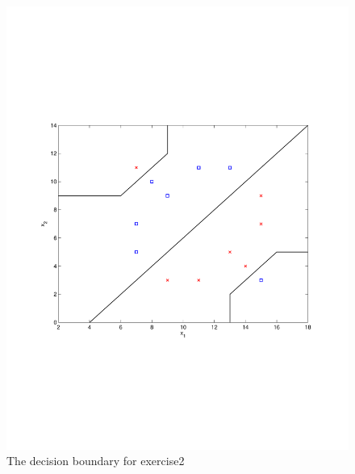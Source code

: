 \documentclass[a4paper,twoside=false,abstract=false,numbers=noenddot,
titlepage=false,headings=small,parskip=half,version=last]{scrartcl}
\theoremstyle{definition}
\theoremstyle{remark}
\begin{document}
\pagebreak
\begin{figure}[t]
    \vspace{-270pt}
    \begin{center}
        \includegraphics[width=1.0\textwidth]{exercise2.pdf}
    \end{center}
    \vspace{-170pt}
    \caption{The decision boundary for exercise2}
    \label{fig:exercise2}
\end{figure}
\end{document}
